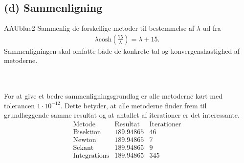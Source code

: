 \subsection*{(d) Sammenligning}
%
\begin{color}{AAUblue2}
Sammenlig de forskellige metoder til bestemmelse af $\lambda$ ud fra 
\begin{align*}
\lambda \text{cosh} \left( \frac{75}{\lambda} \right) = \lambda + 15.
\end{align*}
Sammenligningen skal omfatte både de konkrete tal og konvergenshastighed af metoderne.
\end{color}
\\\\
%
%
For at give et bedre sammenligningsgrundlag er alle metoderne kørt med tolerancen $1\cdot10^{-12}$.
Dette betyder, at alle metoderne finder frem til grundlæggende samme resultat og at antallet af iterationer er det interessante.
%
$$\begin{array}{l|c|c}
\text{Metode} & \text{Resultat} & \text{Iterationer}\\
\hline
\text{Bisektion}	& 189.94865 & 46\\
\text{Newton}		& 189.94865 & 7\\
\text{Sekant}		& 189.94865 & 9\\
\text{Integrations}	& 189.94865 & 345
\end{array}$$